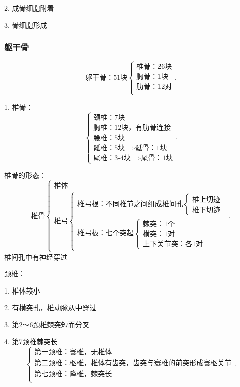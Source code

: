 2. 成骨细胞附着

3. 骨细胞形成
\subsubsection{躯干骨}%
\label{subsub:躯干骨}
\[
    \mbox{躯干骨：51块}
    \begin{cases}
        \mbox{椎骨：26块}\\ 
        \mbox{胸骨：1块}\\ 
        \mbox{肋骨：12对}\\ 
    \end{cases}
.\] 

1. 椎骨：
\[
    \begin{cases}
        \mbox{颈椎：7块}\\ 
        \mbox{胸椎：12块，有肋骨连接}\\ 
        \mbox{腰椎：5块}\\ 
        \mbox{骶椎：5块}\implies \mbox{骶骨：1块}\\
        \mbox{尾椎：3-4块}\implies \mbox{尾骨：1块}
    \end{cases}
.\] 

\begin{notation}
    椎骨的形态：
    \[
        \mbox{椎骨}
        \begin{cases}
            \mbox{椎体}\\ 
            \mbox{椎弓}
            \begin{cases}
                \mbox{椎弓根：不同椎节之间组成椎间孔}
                \begin{cases}
                    \mbox{椎上切迹}\\ 
                    \mbox{椎下切迹}
                \end{cases}\\
                \mbox{椎弓板：七个突起}
                \begin{cases}
                    \mbox{棘突：1个}\\ 
                    \mbox{横突：1对}\\ 
                    \mbox{上下关节突：各1对}
                \end{cases}
            \end{cases}
        \end{cases}
    .\] 
    椎间孔中有神经穿过
\end{notation}

\begin{notation}
    颈椎：

    1. 椎体较小
    
    2. 有横突孔，椎动脉从中穿过

    3. 第2～6颈椎棘突短而分叉

    4. 第7颈椎棘突长
    \[
        \begin{cases}
            \mbox{第一颈椎：寰椎，无椎体}\\ 
            \mbox{第二颈椎：枢椎，椎体有齿突，齿突与寰椎的前突形成寰枢关节}\\ 
            \mbox{第七颈椎：隆椎，棘突长}\\ 
        \end{cases}
    .\] 
\end{notation}


